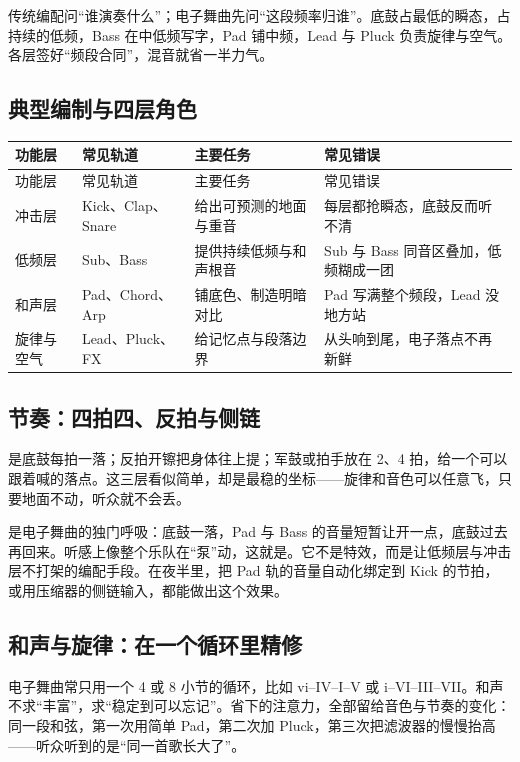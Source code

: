传统编配问“谁演奏什么”；电子舞曲先问“这段频率归谁”。底鼓占最低的瞬态，占持续的低频，Bass 在中低频写字，Pad 铺中频，Lead 与 Pluck 负责旋律与空气。各层签好“频段合同”，混音就省一半力气。

\subsection{典型编制与四层角色}
\label{sec:edm-instrumentation}

\begin{longtable}{p{}p{}p{}p{}}
\toprule
功能层 & 常见轨道 & 主要任务 & 常见错误 \\
\midrule
\endfirsthead
\toprule
功能层 & 常见轨道 & 主要任务 & 常见错误 \\
\midrule
\endhead
冲击层 & Kick、Clap、Snare & 给出可预测的地面与重音 & 每层都抢瞬态，底鼓反而听不清 \\
低频层 & Sub、Bass & 提供持续低频与和声根音 & Sub 与 Bass 同音区叠加，低频糊成一团 \\
和声层 & Pad、Chord、Arp & 铺底色、制造明暗对比 & Pad 写满整个频段，Lead 没地方站 \\
旋律与空气 & Lead、Pluck、FX & 给记忆点与段落边界 & 从头响到尾，电子落点不再新鲜 \\
\bottomrule
\end{longtable}

\subsection{节奏：四拍四、反拍与侧链}
\label{sec:edm-groove}

是底鼓每拍一落；反拍开镲把身体往上提；军鼓或拍手放在 2、4 拍，给一个可以跟着喊的落点。这三层看似简单，却是最稳的坐标——旋律和音色可以任意飞，只要地面不动，听众就不会丢。

是电子舞曲的独门呼吸：底鼓一落，Pad 与 Bass 的音量短暂让开一点，底鼓过去再回来。听感上像整个乐队在“泵”动，这就是。它不是特效，而是让低频层与冲击层不打架的编配手段。在夜半里，把 Pad 轨的音量自动化绑定到 Kick 的节拍，或用压缩器的侧链输入，都能做出这个效果。

\subsection{和声与旋律：在一个循环里精修}
\label{sec:edm-harmony}

电子舞曲常只用一个 4 或 8 小节的循环，比如 vi--IV--I--V 或 i--VI--III--VII。和声不求“丰富”，求“稳定到可以忘记”。省下的注意力，全部留给音色与节奏的变化：同一段和弦，第一次用简单 Pad，第二次加 Pluck，第三次把滤波器的慢慢抬高——听众听到的是“同一首歌长大了”。

